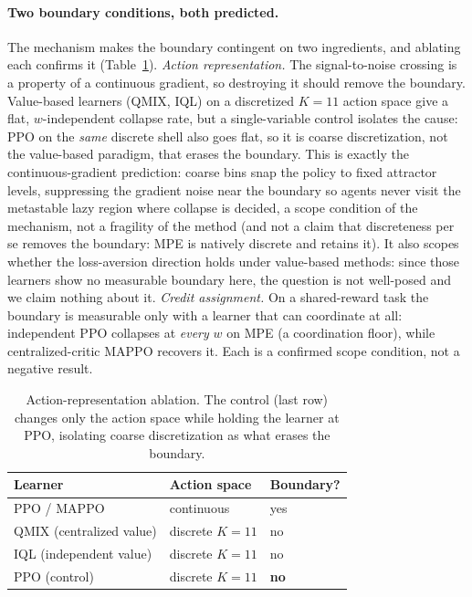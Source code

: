 \documentclass[letterpaper]{article} %
\theoremstyle{plain}
\begin{document}
\paragraph{Two boundary conditions, both predicted.}
The mechanism makes the boundary contingent on two ingredients, and ablating each confirms it
(Table~\ref{tab:ablation}). \emph{Action representation.} The signal-to-noise crossing is a property
of a continuous gradient, so destroying it should remove the boundary. Value-based learners (QMIX,
IQL) on a discretized $K{=}11$ action space give a flat, $w$-independent collapse rate, but a
single-variable control isolates the cause: PPO on the \emph{same} discrete shell also goes flat, so
it is coarse discretization, not the value-based paradigm, that erases the boundary. This is exactly
the continuous-gradient prediction: coarse bins snap the policy to fixed attractor levels,
suppressing the gradient noise near the boundary so agents never visit the metastable lazy region
where collapse is decided, a scope condition of the mechanism, not a fragility of the method (and
not a claim that discreteness per se removes the boundary: MPE is natively discrete and retains it).
It also scopes whether the loss-aversion direction holds under value-based methods: since those
learners show no measurable boundary here, the question is not well-posed and we claim nothing about
it. \emph{Credit assignment.} On a shared-reward task the boundary is measurable only with a learner
that can coordinate at all: independent PPO collapses at \emph{every} $w$ on MPE (a coordination
floor), while centralized-critic MAPPO recovers it. Each is a confirmed scope condition, not a
negative result.

\begin{table}[t]
\centering
\caption{Action-representation ablation. The control (last row) changes only the action space
while holding the learner at PPO, isolating coarse discretization as what erases the boundary.}
\label{tab:ablation}
{\setlength{\tabcolsep}{5pt}\small
\begin{tabular}{lll}
\toprule
Learner & Action space & Boundary? \\
\midrule
PPO / MAPPO & continuous & yes \\
QMIX (centralized value) & discrete $K{=}11$ & no \\
IQL (independent value) & discrete $K{=}11$ & no \\
PPO (control) & discrete $K{=}11$ & \textbf{no} \\
\bottomrule
\end{tabular}}
\end{table}
\end{document}
